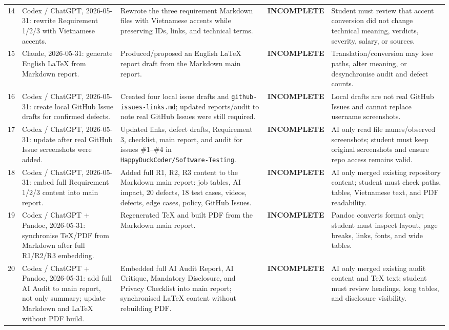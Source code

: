 \documentclass[12pt, a4paper]{article}
\newcommand{\incompl}{\textcolor{WarnOrange}{\textbf{INCOMPLETE}}}
\begin{document}
{\begin{longtable}{@{} C{0.6cm} L{2.8cm} L{3.1cm} C{2.7cm} L{4.8cm} @{}}
14 & Codex / ChatGPT, 2026-05-31: rewrite Requirement 1/2/3 with Vietnamese accents. & Rewrote the three requirement Markdown files with Vietnamese accents while preserving IDs, links, and technical terms. & \incompl{} & Student must review that accent conversion did not change technical meaning, verdicts, severity, salary, or sources. \\[3pt]
15 & Claude, 2026-05-31: generate English LaTeX from Markdown report. & Produced/proposed an English LaTeX report draft from the Markdown main report. & \incompl{} & Translation/conversion may lose paths, alter meaning, or desynchronise audit and defect counts. \\[3pt]
16 & Codex / ChatGPT, 2026-05-31: create local GitHub Issue drafts for confirmed defects. & Created four local issue drafts and \texttt{github-issues-links.md}; updated reports/audit to note real GitHub Issues were still required. & \incompl{} & Local drafts are not real GitHub Issues and cannot replace username screenshots. \\[3pt]
17 & Codex / ChatGPT, 2026-05-31: update after real GitHub Issue screenshots were added. & Updated links, defect drafts, Requirement 3, checklist, main report, and audit for issues \#1--\#4 in \texttt{HappyDuckCoder/Software-Testing}. & \incompl{} & AI only read file names/observed screenshots; student must keep original screenshots and ensure repo access remains valid. \\[3pt]
18 & Codex / ChatGPT, 2026-05-31: embed full Requirement 1/2/3 content into main report. & Added full R1, R2, R3 content to the Markdown main report: job tables, AI impact, 20 defects, 18 test cases, videos, defects, edge cases, policy, GitHub Issues. & \incompl{} & AI only merged existing repository content; student must check paths, tables, Vietnamese text, and PDF readability. \\[3pt]
19 & Codex / ChatGPT + Pandoc, 2026-05-31: synchronise TeX/PDF from Markdown after full R1/R2/R3 embedding. & Regenerated TeX and built PDF from the Markdown main report. & \incompl{} & Pandoc converts format only; student must inspect layout, page breaks, links, fonts, and wide tables. \\[3pt]
20 & Codex / ChatGPT + Pandoc, 2026-05-31: add full AI Audit to main report, not only summary; update Markdown and LaTeX without PDF build. & Embedded full AI Audit Report, AI Critique, Mandatory Disclosure, and Privacy Checklist into main report; synchronised LaTeX content without rebuilding PDF. & \incompl{} & AI only merged existing audit content and TeX text; student must review headings, long tables, and disclosure visibility. \\
\end{longtable}
}
\end{document}
